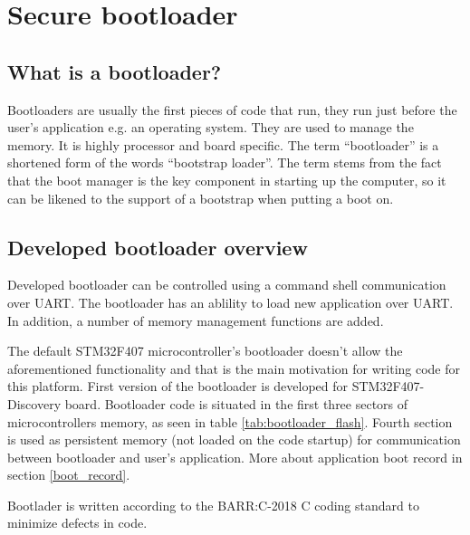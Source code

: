 \chapter{Secure bootloader}
\label{custom_bootloader}

\section{What is a bootloader?}

Bootloaders are usually the first pieces of code that run, they run just before the user's application e.g. an operating system. They are used to manage the memory. It is highly processor and board specific. The term “bootloader” is a shortened form of the words “bootstrap loader”. The term stems from the fact that the boot manager is the key component in starting up the computer, so it can be likened to the support of a bootstrap when putting a boot on.\citep{bootloader_intro} 

\section{Developed bootloader overview}

Developed bootloader can be controlled using a command shell communication over UART. The bootloader has an ablility to load new application over UART. In addition, a number of memory management functions are added.

The default STM32F407 microcontroller's bootloader doesn't allow the aforementioned functionality and that is the main motivation for writing code for this platform. \citep{stm32f407_ref_man} First version of the bootloader is developed for STM32F407-Discovery board. Bootloader code is situated in the first three sectors of microcontrollers memory, as seen in table \ref{tab:bootloader_flash}. Fourth section is used as persistent memory (not loaded on the code startup) for communication between bootloader and user's application. More about application boot record in section \ref{boot_record}. 

Bootlader is written according to the BARR:C-2018 C coding standard to minimize defects in code. \citep{barr_c}

